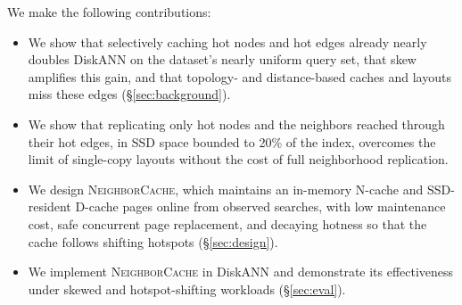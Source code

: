 We make the following contributions:
\begin{itemize}
  \item We show that selectively caching hot nodes and hot edges already nearly doubles DiskANN on the dataset's nearly uniform query set, that skew amplifies this gain, and that topology- and distance-based caches and layouts miss these edges (\S\ref{sec:background}).
  \item We show that replicating only hot nodes and the neighbors reached through their hot edges, in SSD space bounded to 20\% of the index, overcomes the limit of single-copy layouts without the cost of full neighborhood replication.
  \item We design \textsc{NeighborCache}, which maintains an in-memory N-cache and SSD-resident D-cache pages online from observed searches, with low maintenance cost, safe concurrent page replacement, and decaying hotness so that the cache follows shifting hotspots (\S\ref{sec:design}).
  \item We implement \textsc{NeighborCache} in DiskANN and demonstrate its effectiveness under skewed and hotspot-shifting workloads (\S\ref{sec:eval}).
\end{itemize}
